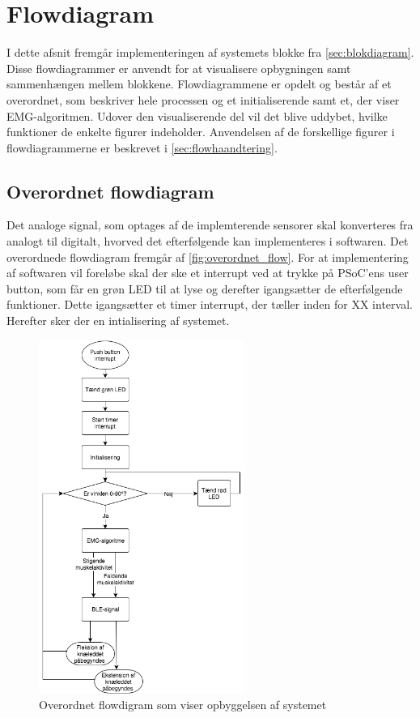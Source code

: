 \section{Flowdiagram}
I dette afsnit fremgår implementeringen af systemets blokke fra \autoref{sec:blokdiagram}. Disse flowdiagrammer er anvendt for at visualisere opbygningen samt sammenhængen mellem blokkene. Flowdiagrammene er opdelt og består af et overordnet, som beskriver hele processen og et initialiserende samt et, der viser EMG-algoritmen. Udover den visualiserende del vil det blive uddybet, hvilke funktioner de enkelte figurer indeholder. Anvendelsen af de forskellige figurer i flowdiagrammerne er beskrevet i \autoref{sec:flowhaandtering}.

\subsection{Overordnet flowdiagram}
Det analoge signal, som optages af de implemterende sensorer skal konverteres fra analogt til digitalt, hvorved det efterfølgende kan implementeres i softwaren. Det overordnede flowdiagram fremgår af \autoref{fig:overordnet_flow}. For at implementering af softwaren vil foreløbe skal der ske et interrupt ved at trykke på PSoC'ens user button, som får en grøn LED til at lyse og derefter igangsætter de efterfølgende funktioner. Dette igangsætter et timer interrupt, der tæller inden for XX interval. Herefter sker der en intialisering af systemet.
\begin{figure}[H]
\centering
\includegraphics[width=0.6\textwidth]{figures/implementering/overordnet_flow.png}
\caption{Overordnet flowdigram som viser opbyggelsen af systemet}
\label{fig:overordnet_flow}
\end{figure}



